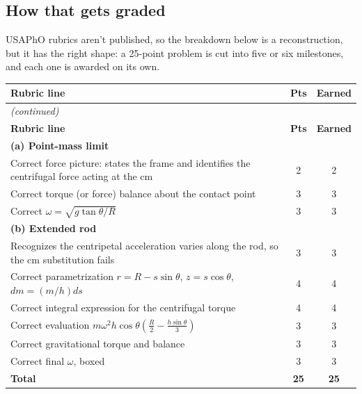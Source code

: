 \documentclass[11pt]{article}
\begin{document}
\pagebreak

\subsection*{How that gets graded}

USAPhO rubrics aren't published, so the breakdown below is a reconstruction, but it has the
right shape: a 25-point problem is cut into five or six milestones, and each one is awarded
on its own.

\begin{center}
\begin{longtable}{p{}cc}
\hline
\textbf{Rubric line} & \textbf{Pts} & \textbf{Earned} \\
\hline
\endfirsthead
\multicolumn{3}{l}{\emph{(continued)}} \\
\hline
\textbf{Rubric line} & \textbf{Pts} & \textbf{Earned} \\
\hline
\endhead
\multicolumn{3}{l}{\textbf{(a) Point-mass limit}} \\
Correct force picture: states the frame and identifies the centrifugal force acting at
the cm & 2 & 2 \\
Correct torque (or force) balance about the contact point & 3 & 3 \\
Correct $\omega = \sqrt{g\tan\theta/R}$ & 3 & 3 \\
\hline
\multicolumn{3}{l}{\textbf{(b) Extended rod}} \\
Recognizes the centripetal acceleration varies along the rod, so the cm substitution
fails & 3 & 3 \\
Correct parametrization $r = R - s\sin\theta$, $z = s\cos\theta$, $dm = (m/h)ds$ & 4 & 4 \\
Correct integral expression for the centrifugal torque & 4 & 4 \\
Correct evaluation $m\omega^2 h\cos\theta\!\left(\tfrac{R}{2} - \tfrac{h\sin\theta}{3}\right)$
& 3 & 3 \\
Correct gravitational torque and balance & 3 & 3 \\
Correct final $\omega$, boxed & 3 & 3 \\
\hline
\textbf{Total} & \textbf{25} & \textbf{25} \\
\hline
\end{longtable}
\end{center}
\end{document}
